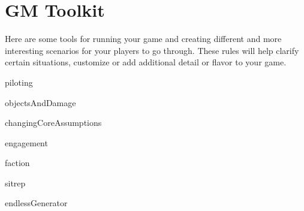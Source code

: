 \chapter{GM Toolkit}

Here are some tools for running your game and creating different and more interesting scenarios
for your players to go through. These rules will help clarify certain situations, customize or add
additional detail or flavor to your game.

{piloting}

{objectsAndDamage}

{changingCoreAssumptions}

{engagement}

{faction}

{sitrep}

{endlessGenerator}
